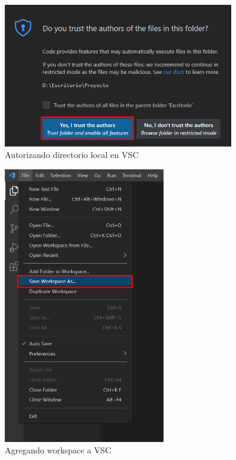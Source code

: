 \begin{figure}[H]
    \begin{center}
        \caption{Autorizando directorio local en VSC}
        \label{fig: 6}
        \includegraphics[width=10cm]{capturas/creando_w3.png}
    \end{center}
\end{figure}
\begin{figure}[H]
    \begin{center}
        \caption{Agregando workspace a VSC}
        \label{fig: 7}
        \includegraphics[width=7cm]{capturas/creando_w4.png}
    \end{center}
\end{figure}

